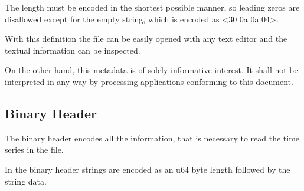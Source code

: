 \documentclass[DIV=10]{scrartcl}
\begin{document}
The length must be encoded in the shortest possible manner, so leading zeros are disallowed except for the empty string, which is encoded as <30 0a 0a 04>.

With this definition the file can be easily opened with any text editor and the textual information can be inspected.

On the other hand, this metadata is of solely informative interest.
It shall not be interpreted in any way by processing applications conforming to this document.

\subsection{Binary Header}

The binary header encodes all the information, that is necessary to read the time series in the file.

In the binary header strings are encoded as an u64 byte length followed by the string data.
\end{document}
